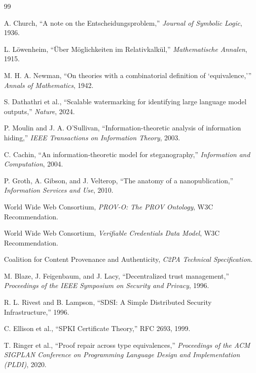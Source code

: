 \documentclass[11pt]{article}
\begin{document}
\begin{thebibliography}{99}

A. Church, ``A note on the Entscheidungsproblem,'' \emph{Journal of Symbolic Logic}, 1936.

L. L\"owenheim, ``\"Uber M\"oglichkeiten im Relativkalk\"ul,'' \emph{Mathematische Annalen}, 1915.

M. H. A. Newman, ``On theories with a combinatorial definition of `equivalence,''' \emph{Annals of Mathematics}, 1942.

S. Dathathri et al., ``Scalable watermarking for identifying large language model outputs,'' \emph{Nature}, 2024.

P. Moulin and J. A. O'Sullivan, ``Information-theoretic analysis of information hiding,'' \emph{IEEE Transactions on Information Theory}, 2003.

C. Cachin, ``An information-theoretic model for steganography,'' \emph{Information and Computation}, 2004.

P. Groth, A. Gibson, and J. Velterop, ``The anatomy of a nanopublication,'' \emph{Information Services and Use}, 2010.

World Wide Web Consortium, \emph{PROV-O: The PROV Ontology}, W3C Recommendation.

World Wide Web Consortium, \emph{Verifiable Credentials Data Model}, W3C Recommendation.

Coalition for Content Provenance and Authenticity, \emph{C2PA Technical Specification}.

M. Blaze, J. Feigenbaum, and J. Lacy, ``Decentralized trust management,'' \emph{Proceedings of the IEEE Symposium on Security and Privacy}, 1996.

R. L. Rivest and B. Lampson, ``SDSI: A Simple Distributed Security Infrastructure,'' 1996.

C. Ellison et al., ``SPKI Certificate Theory,'' RFC 2693, 1999.

T. Ringer et al., ``Proof repair across type equivalences,'' \emph{Proceedings of the ACM SIGPLAN Conference on Programming Language Design and Implementation (PLDI)}, 2020.

\end{thebibliography}
\end{document}
